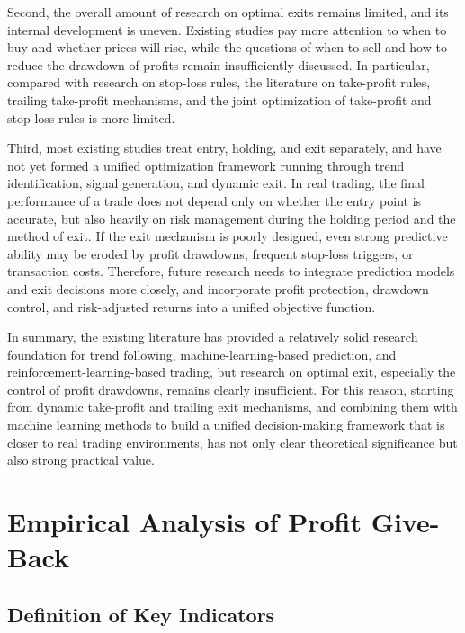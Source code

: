 \documentclass[12pt]{article}
\begin{document}
Second, the overall amount of research on optimal exits remains limited, and its internal 
development is uneven. Existing studies pay more attention to when to buy and whether prices 
will rise, while the questions of when to sell and how to reduce the drawdown of profits remain 
insufficiently discussed. In particular, compared with research on stop-loss rules, the 
literature on take-profit rules, trailing take-profit mechanisms, and the joint optimization of 
take-profit and stop-loss rules is more limited.

Third, most existing studies treat entry, holding, and exit separately, and have not yet formed 
a unified optimization framework running through trend identification, signal generation, and 
dynamic exit. In real trading, the final performance of a trade does not depend only on whether 
the entry point is accurate, but also heavily on risk management during the holding period and 
the method of exit. If the exit mechanism is poorly designed, even strong predictive ability 
may be eroded by profit drawdowns, frequent stop-loss triggers, or transaction costs. Therefore, 
future research needs to integrate prediction models and exit decisions more closely, and incorporate profit protection, drawdown control, and risk-adjusted returns into a unified objective function.

In summary, the existing literature has provided a relatively solid research foundation for 
trend following, machine-learning-based prediction, and reinforcement-learning-based trading, 
but research on optimal exit, especially the control of profit drawdowns, remains clearly 
insufficient. For this reason, starting from dynamic take-profit and trailing exit mechanisms, 
and combining them with machine learning methods to build a unified decision-making framework 
that is closer to real trading environments, has not only clear theoretical significance but 
also strong practical value.


% 
% 


\section{Empirical Analysis of Profit Give-Back}\label{sec:analysisGiveBack}

\subsection{Definition of Key Indicators}
\end{document}
